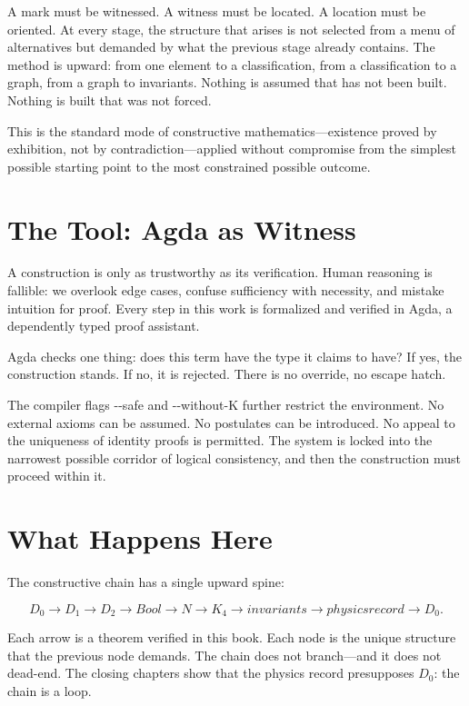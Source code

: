 \documentclass[11pt,a4paper]{book}
\newcommand{\AgdaFlag}[1]{\texttt{-{}-#1}}
\def\mathbb#1{#1}%
\def\texttt#1{#1}%
\def\text#1{#1}%
\begin{document}
A mark must be witnessed. A witness must be located. A location must be oriented. At every stage, the structure that arises is not selected from a menu of alternatives but demanded by what the previous stage already contains. The method is upward: from one element to a classification, from a classification to a graph, from a graph to invariants. Nothing is assumed that has not been built. Nothing is built that was not forced.

This is the standard mode of constructive mathematics---existence proved by exhibition, not by contradiction---applied without compromise from the simplest possible starting point to the most constrained possible outcome.

\section*{The Tool: Agda as Witness}

A construction is only as trustworthy as its verification. Human reasoning is fallible: we overlook edge cases, confuse sufficiency with necessity, and mistake intuition for proof. Every step in this work is formalized and verified in Agda, a dependently typed proof assistant.

Agda checks one thing: does this term have the type it claims to have? If yes, the construction stands. If no, it is rejected. There is no override, no escape hatch.

The compiler flags \AgdaFlag{safe} and \AgdaFlag{without-K} further restrict the environment. No external axioms can be assumed. No postulates can be introduced. No appeal to the uniqueness of identity proofs is permitted. The system is locked into the narrowest possible corridor of logical consistency, and then the construction must proceed within it.

\section*{What Happens Here}

The constructive chain has a single upward spine:

\[
D_0
\longrightarrow D_1
\longrightarrow D_2
\longrightarrow \text{Bool}
\longrightarrow \mathbb{N}
\longrightarrow K_4
\longrightarrow \text{invariants}
\longrightarrow \text{physics record}
\longrightarrow D_0.
\]

Each arrow is a theorem verified in this book. Each node is the unique structure that the previous node demands. The chain does not branch---and it does not dead-end. The closing chapters show that the physics record presupposes $D_0$: the chain is a loop.
\end{document}
